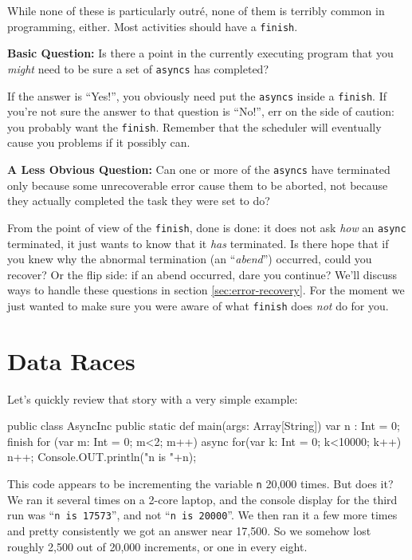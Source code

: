 While none of these is particularly outr\'{e}, none of them is terribly common in \Xten{}
programming, either.   Most activities should have a {\tt finish}.

{\bf Basic Question:} Is there a point in the currently executing program that
you {\em might} need to be sure a set of {\tt asyncs} has completed?  

If the
answer is ``Yes!'',   you obviously need put the {\tt asyncs} inside a {\tt finish}.
If you're not sure the answer to that question is ``No!'', err on the side of caution:
you probably want the {\tt finish}.   Remember that the scheduler will eventually
cause you problems if it possibly can.

{\bf A Less Obvious Question:} Can one or
more of the {\tt asyncs} have terminated only because some unrecoverable
error cause them to be aborted, not because they actually completed the task
they were set to do?  



From the point of view of the {\tt finish}, done is
done: it does not ask {\em how} an {\tt async} terminated, it just wants to know
that it {\em has} terminated.  Is there hope that if you knew why the abnormal
termination (an ``{\em abend}'') occurred, could you recover? 
Or the flip side: if an abend occurred, dare you continue?  We'll discuss ways
to handle these questions in section \ref{sec:error-recovery}.  For the moment
we just wanted to make sure you were aware of what {\tt finish} does {\em not} do for you.

\section{Data Races}
 Let's quickly review that story with a very simple example:
\begin{xtennum}[]
public class AsyncInc {
    public static def main(args: Array[String]) {
       var n : Int = 0;
       finish for (var m: Int = 0; m<2; m++) {
          async for(var k: Int = 0; k<10000; k++) n++; 
       }
       Console.OUT.println("n is "+n);
    }
}
\end{xtennum}
This code appears to be incrementing the variable {\tt n} 20,000 times.  
But does it?  We ran it several times on a 2-core laptop, and the console display
for the third run was ``{\tt n is 17573}'', and not ``{\tt n is 20000}''.
We then ran it a few more times and pretty consistently we got an answer
near 17,500.  So we somehow lost roughly 2,500 out of 20,000 increments,
or one in every eight.

